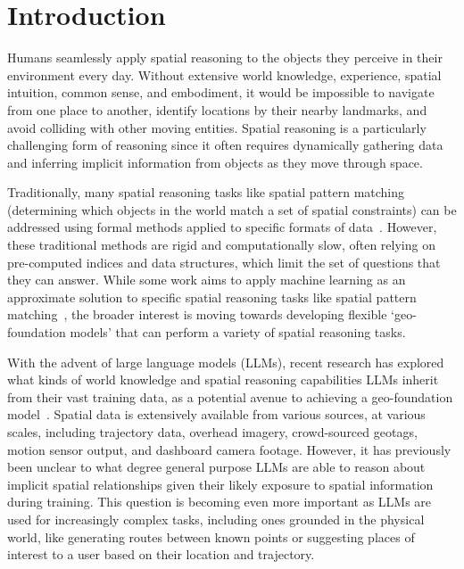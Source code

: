 \section{Introduction}
\label{section:introduction}

Humans seamlessly apply spatial reasoning to the objects they perceive in their environment every day.
Without extensive world knowledge, experience, spatial intuition, common sense, and embodiment, it would be impossible to navigate from one place to another, identify locations by their nearby landmarks, and avoid colliding with other moving entities.
Spatial reasoning is a particularly challenging form of reasoning since it often requires dynamically gathering data and inferring implicit information from objects as they move through space.


Traditionally, many spatial reasoning tasks like spatial pattern matching (determining which objects in the world match a set of spatial constraints) can be addressed using formal methods applied to specific formats of data~\cite{Papadias1998, Schwering2014, Duckham2023,Folkers2000, Chen2019, Fang2019, Minervino2023, Osul2023, Osul2023b}.
However, these traditional methods are rigid and computationally slow, often relying on pre-computed indices and data structures, which limit the set of questions that they can answer.
While some work aims to apply machine learning as an approximate solution to specific spatial reasoning tasks like spatial pattern matching~\cite{Schneider2024, Schneider2024b}, the broader interest is moving towards developing flexible `geo-foundation models' that can perform a variety of spatial reasoning tasks.


With the advent of large language models (LLMs), recent research has explored what kinds of world knowledge and spatial reasoning capabilities LLMs inherit from their vast training data, as a potential avenue to achieving a geo-foundation model~\cite{Mai2023, Bhandari2023, Qi2023, Xie2023translating, Mooney2023,Cohn2023,Bang2023}.
Spatial data is extensively available from various sources, at various scales, including trajectory data, overhead imagery, crowd-sourced geotags, motion sensor output, and dashboard camera footage.
However, it has previously been unclear to what degree general purpose LLMs are able to reason about implicit spatial relationships given their likely exposure to spatial information during training.
This question is becoming even more important as LLMs are used for increasingly complex tasks, including ones grounded in the physical world, like generating routes between known points or suggesting places of interest to a user based on their location and trajectory.



